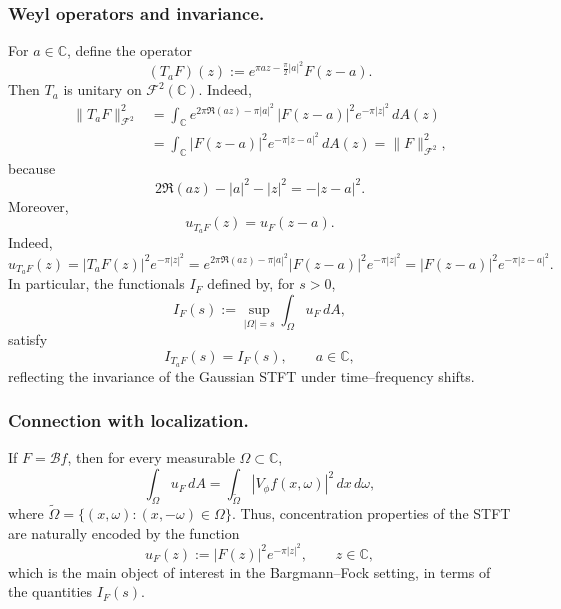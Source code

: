 \documentclass[a4paper,11pt,reqno]{amsart}
\numberwithin{equation}{section}
\theoremstyle{plain} %
\theoremstyle{definition} %
\theoremstyle{remark}
\newcommand{\C}{\mathbb{C}}
\begin{document}
\medskip

\noindent
\subsubsection*{Weyl operators and invariance.}
For $a \in \mathbb{C}$, define the operator
\begin{equation}\label{eq:Ta}
(T_a F)(z) := e^{\pi a z - \frac{\pi}{2}|a|^2} F(z - a).
\end{equation}
Then $T_a$ is unitary on $\mathcal{F}^2(\mathbb{C})$. Indeed,
\begin{align*}
\|T_aF\|_{\mathcal F^2}^2
&=
\int_{\C} e^{2\pi \Re(az)-\pi |a|^2}\,|F(z-a)|^2 e^{-\pi |z|^2}\,dA(z) \\
&=
\int_{\C} |F(z-a)|^2 e^{-\pi |z-a|^2}\,dA(z)
=
\|F\|_{\mathcal F^2}^2,
\end{align*}
because
\[
2\Re(az)-|a|^2-|z|^2=-|z-a|^2.
\]
Moreover,
\begin{equation}\label{eq:u-translation-global}
u_{T_a F}(z) = u_F(z - a).
\end{equation}
Indeed,
\[
u_{T_aF}(z)
=
|T_aF(z)|^2e^{-\pi |z|^2}
=
e^{2\pi\Re(az)-\pi|a|^2}|F(z-a)|^2e^{-\pi |z|^2}
=
|F(z-a)|^2e^{-\pi |z-a|^2}.
\]
In particular, the functionals $I_F$ defined by, 
for \(s>0\),
\[
I_F(s):=\sup_{|\Omega|=s}\int_\Omega u_F\,dA,
\]
satisfy
\begin{equation}\label{eq:I-translation-global}
I_{T_a F}(s) = I_F(s), \qquad a \in \mathbb{C},
\end{equation}
reflecting the invariance of the Gaussian STFT under time--frequency shifts.

\medskip

\noindent
\subsubsection*{Connection with localization.}
If $F = \mathcal{B}f$, then for every measurable $\Omega \subset \mathbb{C}$,
\[
\int_\Omega u_F \, dA
= \int_{\widetilde{\Omega}} |V_\phi f(x,\omega)|^2 \, dx\, d\omega,
\]
where $\widetilde{\Omega} = \{(x,\omega) : (x,-\omega) \in \Omega\}$.
Thus, concentration properties of the STFT are naturally encoded by the function
\begin{equation}\label{eq:uF}
u_F(z) := |F(z)|^2 e^{-\pi |z|^2}, \qquad z \in \mathbb{C},
\end{equation}
which is the main object of interest in the Bargmann--Fock setting, in terms of the
quantities $I_F(s)$.

\medskip
\end{document}
